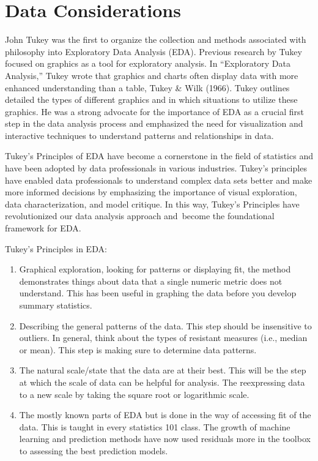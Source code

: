 \documentclass[print]{nuthesis}
\begin{document}
\hypertarget{data-considerations}{%
\section{Data Considerations}\label{data-considerations}}

John Tukey was the first to organize the collection and methods associated with philosophy into Exploratory Data Analysis (EDA).
Previous research by Tukey focused on graphics as a tool for exploratory analysis.
In ``Exploratory Data Analysis,'' Tukey wrote that graphics and charts often display data with more enhanced understanding than a table, Tukey \& Wilk (1966).
Tukey outlines detailed the types of different graphics and in which situations to utilize these graphics.
He was a strong advocate for the importance of EDA as a crucial first step in the data analysis process and emphasized the need for visualization and interactive techniques to understand patterns and relationships in data.

Tukey's Principles of EDA have become a cornerstone in the field of statistics and have been adopted by data professionals in various industries.
Tukey's principles have enabled data professionals to understand complex data sets better and make more informed decisions by emphasizing the importance of visual exploration, data characterization, and model critique.
In this way, Tukey's Principles have revolutionized our data analysis approach and~become the foundational framework for EDA.

Tukey's Principles in EDA:

\begin{enumerate}
\def\labelenumi{\arabic{enumi}.}
\item
  Graphical exploration, looking for patterns or displaying fit, the method demonstrates things about data that a single numeric metric does not understand.
  This has been useful in graphing the data before you develop summary statistics.
\item
  Describing the general patterns of the data.
  This step should be insensitive to outliers.
  In general, think about the types of resistant measures (i.e., median or mean).
  This step is making sure to determine data patterns.
\item
  The natural scale/state that the data are at their best.
  This will be the step at which the scale of data can be helpful for analysis.
  The reexpressing data to a new scale by taking the square root or logarithmic scale.
\item
  The mostly known parts of EDA but is done in the way of accessing fit of the data.
  This is taught in every statistics 101 class.
  The growth of machine learning and prediction methods have now used residuals more in the toolbox to assessing the best prediction models.
\end{enumerate}
\end{document}
